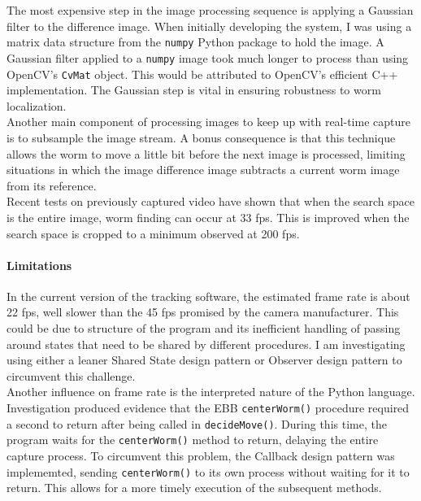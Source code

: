 \documentclass[main.tex]{subfiles}
\begin{document}
The most expensive step in the image processing sequence is applying a Gaussian filter to the difference image. When initially developing the system, I was using a matrix data structure from the \verb|numpy| Python package to hold the image. A Gaussian filter applied to a \verb|numpy| image took much longer to process than using OpenCV's \verb|CvMat| object. This would be attributed to OpenCV's efficient C++ implementation. The Gaussian step is vital in ensuring robustness to worm localization. \\

Another main component of processing images to keep up with real-time capture is to subsample the image stream. A bonus consequence is that this technique allows the worm to move a little bit before the next image is processed, limiting situations in which the image difference image subtracts a current worm image from its reference.\\

Recent tests on previously captured video have shown that when the search space is the entire image, worm finding can occur at 33 fps. This is improved when the search space is cropped to a minimum observed at 200 fps. 

\paragraph{Limitations}
In the current version of the tracking software, the estimated frame rate is about 22 fps, well slower than the 45 fps promised by the camera manufacturer. This could be due to structure of the program and its inefficient handling of passing around states that need to be shared by different procedures. I am investigating using either a leaner Shared State design pattern or Observer design pattern to circumvent this challenge. \\ 

Another influence on frame rate is the interpreted nature of the Python language. Investigation produced evidence that the EBB \verb|centerWorm()| procedure required a second to return after being called in \verb|decideMove()|. During this time, the program waits for the \verb|centerWorm()| method to return, delaying the entire capture process. To circumvent this problem, the Callback design pattern was implememted, sending \verb|centerWorm()| to its own process without waiting for it to return. This allows for a more timely execution of the subsequent methods. \\
\end{document}
